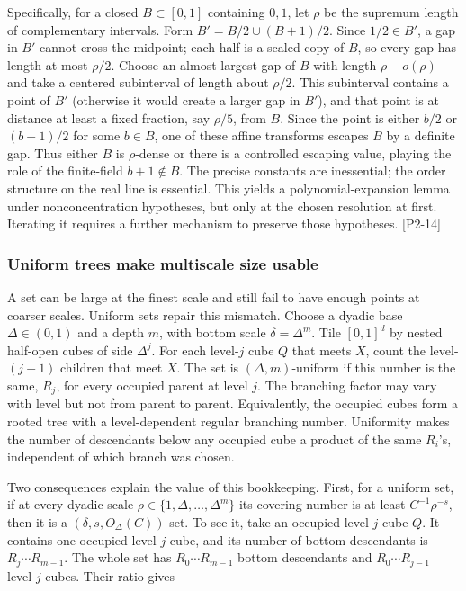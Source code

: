 Specifically, for a closed \(B\subset[0,1]\) containing \(0,1\), let \(\rho\) be the supremum length of complementary intervals. Form \(B'=B/2\cup(B+1)/2\). Since \(1/2\in B'\), a gap in \(B'\) cannot cross the midpoint; each half is a scaled copy of \(B\), so every gap has length at most \(\rho/2\). Choose an almost-largest gap of \(B\) with length \(\rho-o(\rho)\) and take a centered subinterval of length about \(\rho/2\). This subinterval contains a point of \(B'\) (otherwise it would create a larger gap in \(B'\)), and that point is at distance at least a fixed fraction, say \(\rho/5\), from \(B\). Since the point is either \(b/2\) or \((b+1)/2\) for some \(b\in B\), one of these affine transforms escapes \(B\) by a definite gap. Thus either \(B\) is \(\rho\)-dense or there is a controlled escaping value, playing the role of the finite-field \(b+1\notin B\). The precise constants are inessential; the order structure on the real line is essential. This yields a polynomial-expansion lemma under nonconcentration hypotheses, but only at the chosen resolution at first. Iterating it requires a further mechanism to preserve those hypotheses. {[}P2-14{]}

\subsubsection{Uniform trees make multiscale size usable}\label{04-visual-computing-ii-ch033-uniform-trees-make-multiscale-size-usable-1}

A set can be large at the finest scale and still fail to have enough points at coarser scales. Uniform sets repair this mismatch. Choose a dyadic base \(\Delta\in(0,1)\) and a depth \(m\), with bottom scale \(\delta=\Delta^m\). Tile \([0,1]^d\) by nested half-open cubes of side \(\Delta^j\). For each level-\(j\) cube \(Q\) that meets \(X\), count the level-\((j+1)\) children that meet \(X\). The set is \((\Delta,m)\)-uniform if this number is the same, \(R_j\), for every occupied parent at level \(j\). The branching factor may vary with level but not from parent to parent. Equivalently, the occupied cubes form a rooted tree with a level-dependent regular branching number. Uniformity makes the number of descendants below any occupied cube a product of the same \(R_i\)'s, independent of which branch was chosen.

Two consequences explain the value of this bookkeeping. First, for a uniform set, if at every dyadic scale \(\rho\in\{1,\Delta,\ldots,\Delta^m\}\) its covering number is at least \(C^{-1}\rho^{-s}\), then it is a \((\delta,s,O_\Delta(C))\) set. To see it, take an occupied level-\(j\) cube \(Q\). It contains one occupied level-\(j\) cube, and its number of bottom descendants is \(R_j\cdots R_{m-1}\). The whole set has \(R_0\cdots R_{m-1}\) bottom descendants and \(R_0\cdots R_{j-1}\) level-\(j\) cubes. Their ratio gives

